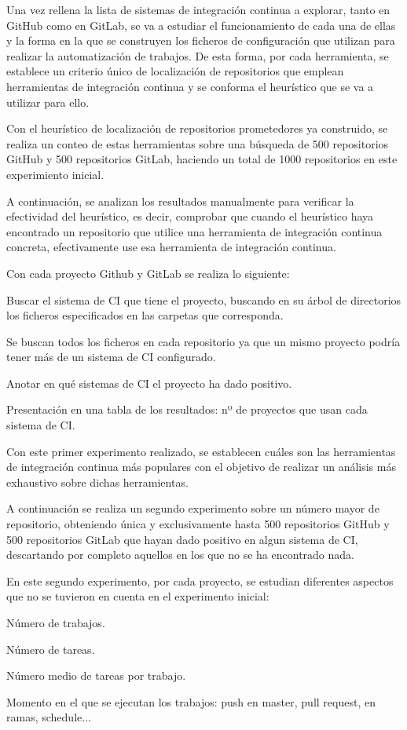 Una vez rellena la lista de sistemas de integración continua a explorar, tanto en GitHub como en GitLab, se va a estudiar el funcionamiento de cada una de ellas y la forma en la que se construyen los ficheros de configuración que utilizan para realizar la automatización de trabajos. De esta forma, por cada herramienta, se establece un criterio único de localización de repositorios que emplean herramientas de integración continua y se conforma el heurístico que se va a utilizar para ello.

Con el heurístico de localización de repositorios prometedores ya construido, se realiza un conteo de estas herramientas sobre una búsqueda de 500 repositorios GitHub y 500 repositorios GitLab, haciendo un total de 1000 repositorios en este experimiento inicial.

A continuación, se analizan los resultados manualmente para verificar la efectividad del heurístico, es decir, comprobar que cuando el heurístico haya encontrado un repositorio que utilice una herramienta de integración continua concreta, efectivamente use esa herramienta de integración continua.

Con cada proyecto Github y GitLab se realiza lo siguiente:
\begin{compactitem}
    \item Buscar el sistema de CI que tiene el proyecto, buscando en su árbol de directorios los ficheros especificados en las carpetas que corresponda.
    \item Se buscan todos los ficheros en cada repositorio ya que un mismo proyecto podría tener más de un sistema de CI configurado.
    \item Anotar en qué sistemas de CI el proyecto ha dado positivo.
    \item Presentación en una tabla de los resultados: nº de proyectos que usan cada sistema de CI.
\end{compactitem}
	
Con este primer experimento realizado, se establecen cuáles son las herramientas de integración continua más populares con el objetivo de realizar un análisis más exhaustivo sobre dichas herramientas.

A continuación se realiza un segundo experimento sobre un número mayor de repositorio, obteniendo única y exclusivamente hasta 500 repositorios GitHub y 500 repositorios GitLab que hayan dado positivo en algun sistema de CI, descartando por completo aquellos en los que no se ha encontrado nada.

En este segundo experimento, por cada proyecto, se estudian diferentes aspectos que no se tuvieron en cuenta en el experimento inicial:
\begin{compactitem}
    \item Número de trabajos.
    \item Número de tareas.
    \item Número medio de tareas por trabajo.
    \item Momento en el que se ejecutan los trabajos: push en master, pull request, en ramas, schedule...
\end{compactitem}

